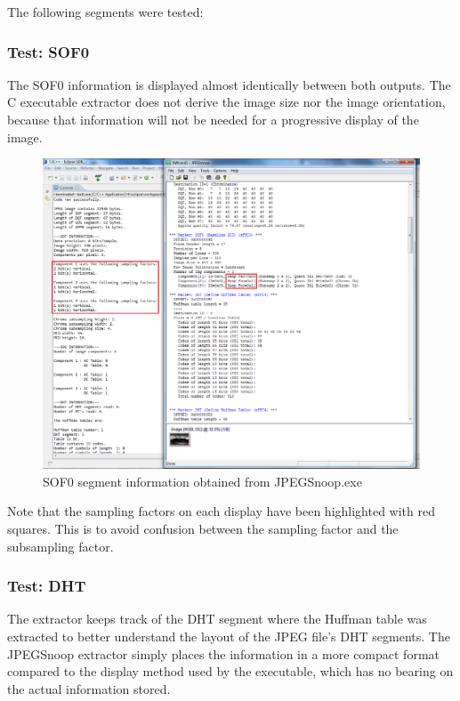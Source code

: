 The following segments were tested:

\subsubsection{Test: SOF0}

The SOF0 information is displayed almost
identically between both outputs.
The C executable extractor does not derive the image size nor the
image orientation, because that information will
not be needed for a progressive display of the image.

\newpage

\begin{figure}[!hbtp]
\begin{center}
\includegraphics[scale=0.5]{figures/jpegSOFtest.png} 
\end{center}
\caption{SOF0 segment information obtained from JPEGSnoop.exe}
\end{figure}

Note that the sampling factors on each display have
been highlighted with red squares. This is to avoid 
confusion between the sampling factor and the 
subsampling factor.

\subsubsection{Test: DHT}

The extractor keeps track of the DHT segment where the Huffman
table was extracted to better understand the layout of the JPEG
file's DHT segments. The JPEGSnoop extractor simply places the
information in a more compact format compared to the display 
method used by the executable, which has no bearing on the actual
information stored.

